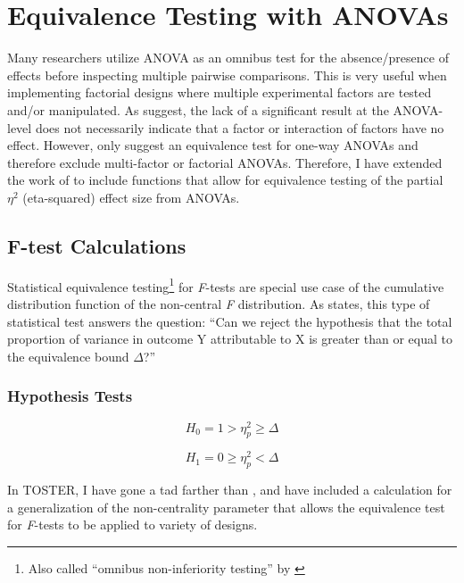 \documentclass[]{interact}
\theoremstyle{plain}%
\theoremstyle{definition}
\theoremstyle{remark}
\begin{document}
\newpage

\hypertarget{equivalence-testing-with-anovas}{%
\section{Equivalence Testing with
ANOVAs}\label{equivalence-testing-with-anovas}}

Many researchers utilize ANOVA as an omnibus test for the
absence/presence of effects before inspecting multiple pairwise
comparisons. This is very useful when implementing factorial designs
where multiple experimental factors are tested and/or manipulated. As
\citet{Campbell_2021} suggest, the lack of a significant result at the
ANOVA-level does not necessarily indicate that a factor or interaction
of factors have no effect. However, \citet{Campbell_2021} only suggest
an equivalence test for one-way ANOVAs and therefore exclude
multi-factor or factorial ANOVAs. Therefore, I have extended the work of
\citet{Campbell_2021} to include functions that allow for equivalence
testing of the partial \(\eta^2\) (eta-squared) effect size from ANOVAs.

\hypertarget{f-test-calculations}{%
\subsection{F-test Calculations}\label{f-test-calculations}}

Statistical equivalence testing\footnote{Also called ``omnibus
  non-inferiority testing'' by \citet{Campbell_2021}} for \emph{F}-tests
are special use case of the cumulative distribution function of the
non-central \emph{F} distribution. As \citet{Campbell_2021} states, this
type of statistical test answers the question: ``Can we reject the
hypothesis that the total proportion of variance in outcome Y
attributable to X is greater than or equal to the equivalence bound
\(\Delta\)?''

\hypertarget{hypothesis-tests}{%
\subsubsection{Hypothesis Tests}\label{hypothesis-tests}}

\[
H_0 =  1 > \eta^2_p \geq \Delta
\]

\[
H_1 =  0 \geq \eta^2_p < \Delta
\]

In TOSTER, I have gone a tad farther than \citet{Campbell_2021}, and
have included a calculation for a generalization of the non-centrality
parameter that allows the equivalence test for \emph{F}-tests to be
applied to variety of designs.
\end{document}
